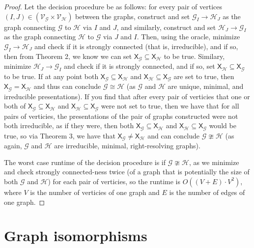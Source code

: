 \documentclass[hidelinks]{article}
\newcommand{\Gc}{\mathcal{G}}  %
\newcommand{\Hc}{\mathcal{H}}  %
\newcommand{\Vc}{\mathcal{V}}
\newcommand{\shift}[1]{\mathsf{X}_{#1}}
\theoremstyle{definition}
\begin{document}
    \begin{proof}
        Let the decision procedure be as follows:
        for every pair of vertices
        \((I, J) \in (\Vc_\Gc \times \Vc_\Hc)\) between the graphs,
        construct and set \(\Gc_I\to\Hc_J\) as the graph connecting \(\Gc\) to \(\Hc\)
        via \(I\) and \(J\), and similarly, construct and set \(\Hc_J \to \Gc_I\) as the graph connecting 
        \(\Hc\) to \(\Gc\) via \(J\) and \(I\). Then,
        using the oracle, minimize \(\Gc_I \to \Hc_J\) and check if it is strongly connected (that is, irreducible),
        and if so, then from Theorem 2, we know we can 
        set \(\shift{\Gc} \subseteq \shift{\Hc}\) to be true.
        Similary, minimize \(\Hc_J \to \Gc_I\) and check if it is strongly connected, and 
        if so, set \(\shift{\Hc} \subseteq \shift{\Gc}\) to be true.
        If at any point both \(\shift{\Gc} \subseteq \shift{\Hc}\) and \(\shift{\Hc} \subseteq \shift{\Gc}\)
        are set to true, then \(\shift{\Gc} = \shift{\Hc}\) and thus can conclude \(\Gc \cong \Hc\) (as 
        \(\Gc\) and \(\Hc\) are unique, minimal, and irreducible presentations). If you find that 
        after every pair of verticies that one or both  
        of \(\shift{\Gc} \subseteq \shift{\Hc}\) and \(\shift{\Hc} \subseteq \shift{\Gc}\)
        were not set to true, then we have that for all pairs of verticies,
        the presentations of the pair of graphs constructed were not both 
        irreducible, as if they were, then both \(\shift{\Gc} \subseteq \shift{\Hc}\)
        and \(\shift{\Hc} \subseteq \shift{\Gc}\) would be true, so via Theorem 3, we have that \(\shift{\Gc} \neq \shift{\Hc}\)
        and can conclude \(\Gc \ncong \Hc\) (as again, \(\Gc\) and \(\Hc\) are irreducible, minimal, right-resolving 
        graphs).
        
        The worst case runtime of the decision procedure is if \(\Gc \ncong \Hc\),
        as we minimize and check strongly connected-ness twice 
        (of a graph that is potentially the size of both \(\Gc\) and \(\Hc\))
        for each pair of verticies, so the runtime is \(O((V+E)\cdot V^2)\),
        where \(V\) is the number of verticies of one graph and \(E\)
        is the number of edges of one graph.
    \end{proof}

\newpage

\section{Graph isomorphisms}
\end{document}

